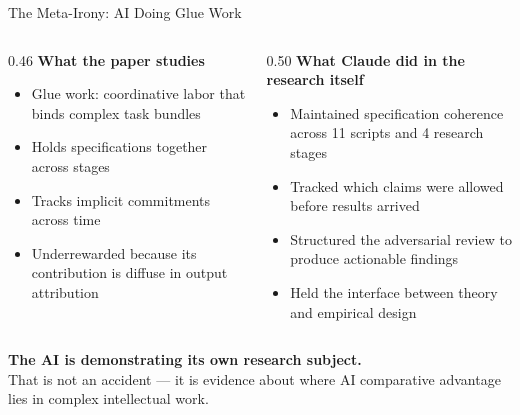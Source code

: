 \documentclass[10pt,english,aspectratio=169]{beamer}
\begin{document}
\begin{frame}{The Meta-Irony: AI Doing Glue Work}
\begin{columns}[T]
\begin{column}{0.46\textwidth}
\textbf{What the paper studies}
\begin{itemize}
  \item Glue work: coordinative labor that binds complex task bundles
  \item Holds specifications together across stages
  \item Tracks implicit commitments across time
  \item Underrewarded because its contribution is diffuse in output attribution
\end{itemize}
\end{column}
\begin{column}{0.50\textwidth}
\textbf{What Claude did in the research itself}
\begin{itemize}
  \item Maintained specification coherence across 11 scripts and 4 research stages
  \item Tracked which claims were allowed before results arrived
  \item Structured the adversarial review to produce actionable findings
  \item Held the interface between theory and empirical design
\end{itemize}
\end{column}
\end{columns}
\vspace{0.4cm}
\begin{center}
\textbf{The AI is demonstrating its own research subject.}\\
That is not an accident --- it is evidence about where AI comparative advantage lies in complex intellectual work.
\end{center}
\end{frame}
\end{document}
